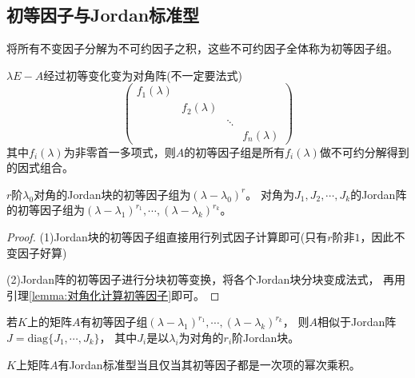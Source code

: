 \subsection{初等因子与Jordan标准型}

\begin{definition}[初等因子]
将所有不变因子分解为不可约因子之积，这些不可约因子全体称为初等因子组。
\end{definition}

\begin{theorem}[对角化计算初等因子] \label{lemma:对角化计算初等因子}
  $\lambda E - A$经过初等变化变为对角阵(不一定要法式)
  \begin{equation*}
    \left(\begin{array}{llll}
            f_{1}(\lambda) & & & \\
                           & f_{2}(\lambda) & & \\
                           & & \ddots & \\
                           & & & f_{n}(\lambda)
          \end{array}\right)
  \end{equation*}
  其中$f_i(\lambda)$为非零首一多项式，则$A$的初等因子组是所有$f_i(\lambda)$做不可约分解得到的因式组合。
\end{theorem}

\begin{lemma}
  $r$阶$\lambda_0$对角的Jordan块的初等因子组为$(\lambda - \lambda_0)^r$。
  对角为$J_1,J_2,\cdots,J_k$的Jordan阵的初等因子组为$(\lambda - \lambda_1)^{r_1}, \cdots, (\lambda - \lambda_k)^{r_k}$。
\end{lemma}

\begin{proof}
  (1)Jordan块的初等因子组直接用行列式因子计算即可(只有$r$阶非$1$，因此不变因子好算)

  (2)Jordan阵的初等因子进行分块初等变换，将各个Jordan块分块变成法式，
  再用引理\ref{lemma:对角化计算初等因子}即可。
\end{proof}

\begin{theorem}[使用初等因子计算Jordan标准型]
  若$K$上的矩阵$A$有初等因子组$(\lambda - \lambda_1)^{r_1}, \cdots, (\lambda - \lambda_k)^{r_k}$，
  则$A$相似于Jordan阵$J = \text{diag}\{J_1,\cdots,J_k\}$，
  其中$J_i$是以$\lambda_i$为对角的$r_i$阶Jordan块。
\end{theorem}

\begin{theorem}[Jordan标准型存在充要条件]
  $K$上矩阵$A$有Jordan标准型当且仅当其初等因子都是一次项的幂次乘积。
\end{theorem}



